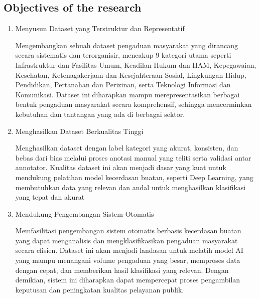 \documentclass[12pt,a4paper]{article}
\begin{document}
\subsection{Objectives of the research}
\begin{enumerate}
  \item Menyusun Dataset yang Terstruktur dan Representatif
  \begin{adjustwidth}{0em}{0pt} 
  Mengembangkan sebuah dataset pengaduan masyarakat yang dirancang secara sistematis dan terorganisir, mencakup 9 kategori utama seperti Infrastruktur dan Fasilitas Umum, Keadilan Hukum dan HAM, Kepegawaian, Kesehatan, Ketenagakerjaan dan Kesejahteraan Sosial, Lingkungan Hidup, Pendidikan, Pertanahan dan Perizinan, serta Teknologi Informasi dan Komunikasi. Dataset ini diharapkan mampu merepresentasikan berbagai bentuk pengaduan masyarakat secara komprehensif, sehingga mencerminkan kebutuhan dan tantangan yang ada di berbagai sektor.\end{adjustwidth}
  
  \item Menghasilkan Dataset Berkualitas Tinggi
  \begin{adjustwidth}{0em}{0pt} 
  Menghasilkan dataset dengan label kategori yang akurat, konsisten, dan bebas dari bias melalui proses anotasi manual yang teliti serta validasi antar annotator. Kualitas dataset ini akan menjadi dasar yang kuat untuk mendukung pelatihan model kecerdasan buatan, seperti Deep Learning, yang membutuhkan data yang relevan dan andal untuk menghasilkan klasifikasi yang tepat dan akurat\end{adjustwidth}
  
  \item Mendukung Pengembangan Sistem Otomatis
  \begin{adjustwidth}{0em}{0pt} 
  Memfasilitasi pengembangan sistem otomatis berbasis kecerdasan buatan yang dapat menganalisis dan mengklasifikasikan pengaduan masyarakat secara efisien. Dataset ini akan menjadi landasan untuk melatih model AI yang mampu menangani volume pengaduan yang besar, memproses data dengan cepat, dan memberikan hasil klasifikasi yang relevan. Dengan demikian, sistem ini diharapkan dapat mempercepat proses pengambilan keputusan dan peningkatan kualitas pelayanan publik.
  \end{adjustwidth}
\end{enumerate}




\end{document}
